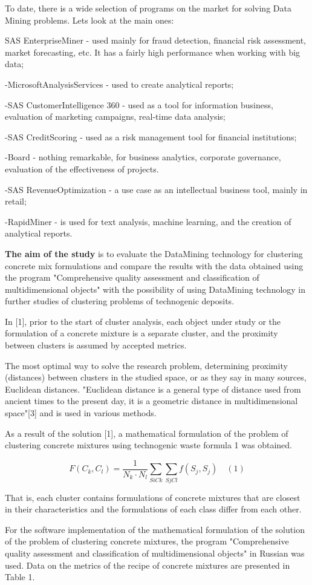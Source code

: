 \begin{multicols}{2}
To date, there is a wide selection of programs on the market for solving
Data Mining problems. Let\textquotesingle s look at the main ones:

SAS EnterpriseMiner - used mainly for fraud detection, financial risk
assessment, market forecasting, etc. It has a fairly high performance
when working with big data;

-MicrosoftAnalysisServices - used to create analytical reports;

-SAS CustomerIntelligence 360 - used as a tool for information
business, evaluation of marketing campaigns, real-time data analysis;

-SAS CreditScoring - used as a risk management tool for financial
institutions;

-Board - nothing remarkable, for business analytics, corporate
governance, evaluation of the effectiveness of projects.

-SAS RevenueOptimization - a use case as an intellectual business
tool, mainly in retail;

-RapidMiner - is used for text analysis, machine learning, and the
creation of analytical reports.

{\bfseries The aim of the study} is to evaluate the DataMining technology
for clustering concrete mix formulations and compare the results with
the data obtained using the program "Comprehensive quality assessment
and classification of multidimensional objects" with the possibility of
using DataMining technology in further studies of clustering problems of
technogenic deposits.

In {[}1{]}, prior to the start of cluster analysis, each object under
study or the formulation of a concrete mixture is a separate cluster,
and the proximity between clusters is assumed by accepted metrics.

The most optimal way to solve the research problem, determining
proximity (distances) between clusters in the studied space, or as they
say in many sources, Euclidean distances. "Euclidean distance is a
general type of distance used from ancient times to the present day, it
is a geometric distance in multidimensional space"{[}3{]} and is used in
various methods.

As a result of the solution {[}1{]}, a mathematical formulation of the
problem of clustering concrete mixtures using technogenic waste formula
1 was obtained.

\[F(C_k, C_l) = \frac{1}{{N_k \cdot N_l}} \sum\limits_{SiCk} \sum\limits_{SjCl} f(S_j, S_j) \quad (1)\]

That is, each cluster contains formulations of concrete mixtures that
are closest in their characteristics and the formulations of each class
differ from each other.

For the software implementation of the mathematical formulation of the
solution of the problem of clustering concrete mixtures, the program
"Comprehensive quality assessment and classification of multidimensional
objects" in Russian was used. Data on the metrics of the recipe of
concrete mixtures are presented in Table 1.
\end{multicols}

